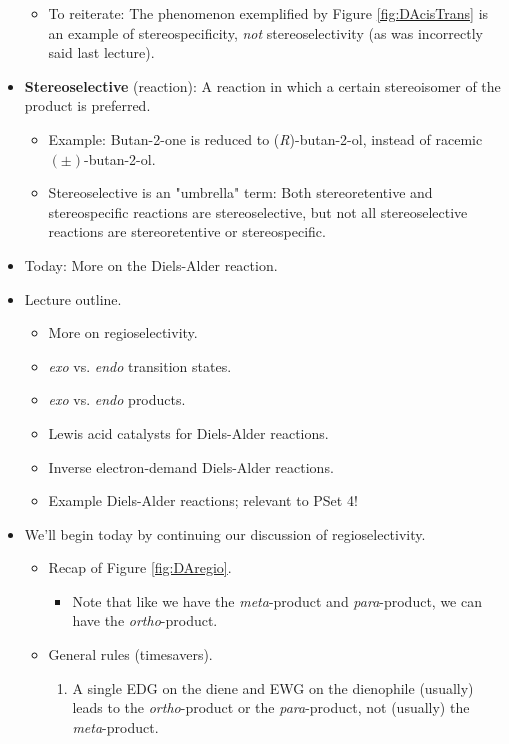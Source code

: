 \documentclass[../notes.tex]{subfiles}
\begin{document}
\begin{itemize}
\begin{itemize}
        \item To reiterate: The phenomenon exemplified by Figure \ref{fig:DAcisTrans} is an example of stereospecificity, \emph{not} stereoselectivity (as was incorrectly said last lecture).
    \end{itemize}
    \item \textbf{Stereoselective} (reaction): A reaction in which a certain stereoisomer of the product is preferred.
    \begin{itemize}
        \item Example: Butan-2-one is reduced to (\emph{R})-butan-2-ol, instead of racemic $(\pm)$-butan-2-ol.
        \item Stereoselective is an "umbrella" term: Both stereoretentive and stereospecific reactions are stereoselective, but not all stereoselective reactions are stereoretentive or stereospecific.
    \end{itemize}
    \item Today: More on the Diels-Alder reaction.
    \item Lecture outline.
    \begin{itemize}
        \item More on regioselectivity.
        \item \emph{exo} vs. \emph{endo} transition states.
        \item \emph{exo} vs. \emph{endo} products.
        \item Lewis acid catalysts for Diels-Alder reactions.
        \item Inverse electron-demand Diels-Alder reactions.
        \item Example Diels-Alder reactions; relevant to PSet 4!
    \end{itemize}
    \item We'll begin today by continuing our discussion of regioselectivity.
    \begin{itemize}
        \item Recap of Figure \ref{fig:DAregio}.
        \begin{itemize}
            \item Note that like we have the \emph{meta}-product and \emph{para}-product, we can have the \emph{ortho}-product.
        \end{itemize}
        \item General rules (timesavers).
        \begin{enumerate}
            \item A single EDG on the diene and EWG on the dienophile (usually) leads to the \emph{ortho}-product or the \emph{para}-product, not (usually) the \emph{meta}-product.

\end{enumerate}
\end{itemize}
\end{itemize}
\end{document}

